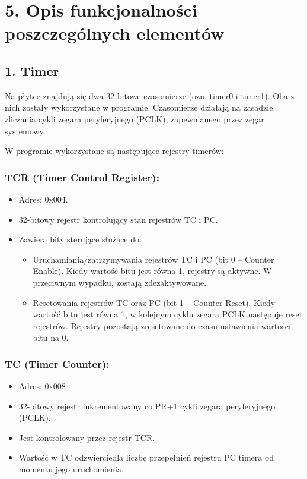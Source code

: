 \documentclass[a4paper,12pt]{report}
\begin{document}
\section*{5. Opis funkcjonalności poszczególnych elementów}

\subsection*{1. Timer}
Na płytce znajdują się dwa 32-bitowe czasomierze (ozn. timer0 i timer1). Oba z nich zostały wykorzystane w programie. Czasomierze działają na zasadzie zliczania cykli zegara peryferyjnego (PCLK), zapewnianego przez zegar systemowy.

W programie wykorzystane są następujące rejestry timerów:

\subsubsection*{TCR (Timer Control Register):}
\begin{itemize}
    \item Adres: 0x004.
    \item 32-bitowy rejestr kontrolujący stan rejestrów TC i PC.
    \item Zawiera bity sterujące służące do:
    \begin{itemize}
        \item Uruchamiania/zatrzymywania rejestrów TC i PC (bit 0 – Counter Enable). Kiedy wartość bitu jest równa 1, rejestry są aktywne. W przeciwnym wypadku, zostają zdezaktywowane.
        \item Resetowania rejestrów TC oraz PC (bit 1 – Counter Reset). Kiedy wartość bitu jest równa 1, w kolejnym cyklu zegara PCLK następuje reset rejestrów. Rejestry pozostają zresetowane do czasu ustawienia wartości bitu na 0.
    \end{itemize}
\end{itemize}

\subsubsection*{TC (Timer Counter):}
\begin{itemize}
    \item Adres: 0x008
    \item 32-bitowy rejestr inkrementowany co PR+1 cykli zegara peryferyjnego (PCLK).
    \item Jest kontrolowany przez rejestr TCR.
    \item Wartość w TC odzwierciedla liczbę przepełnień rejestru PC timera od momentu jego uruchomienia.
\end{itemize}
\end{document}
